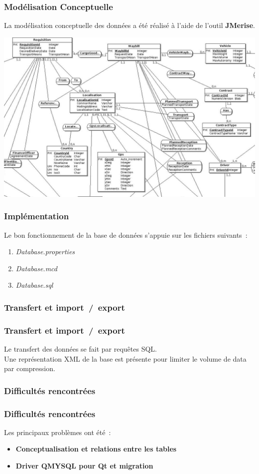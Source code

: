 \begin{frame}
\frametitle{Modélisation Conceptuelle}
La modélisation conceptuelle des données a été réalisé à l'aide de l'outil \textbf{JMerise}.\\
\begin{center}
\includegraphics[scale=0.15]{Images/DatabaseSize}
\end{center}
\end{frame}

\begin{frame}
\frametitle{Implémentation}
Le bon fonctionnement de la base de données s'appuie sur les fichiers suivants~:
\begin{enumerate}
	\item<2-> \emph{Database.properties}
	\item<3-> \emph{Database.mcd}
	\item<4-> \emph{Database.sql}
\end{enumerate}
\end{frame}

\subsubsection[Transfert et import~/~export]{Transfert et import~/~export}

\begin{frame}
\frametitle{Transfert et import~/~export}
Le transfert des données se fait par requêtes SQL.\\
Une représentation XML de la base est présente pour limiter le volume de data par compression.\\
\end{frame}

\subsubsection{Difficultés rencontrées}

\begin{frame}
\frametitle{Difficultés rencontrées}
Les principaux problèmes ont été~:
\begin{itemize}
\item<2-> \textbf{Conceptualisation et relations entre les tables}
\item<3-> \textbf{Driver QMYSQL pour Qt et migration}
\end{itemize}
\end{frame}
